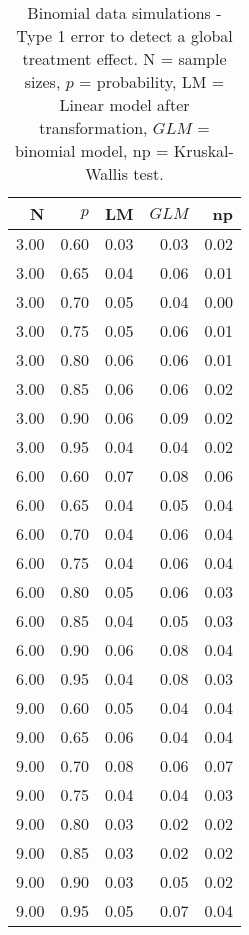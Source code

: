 \begin{table}[H]
\centering
\caption{Binomial data simulations - Type 1 error to detect a global treatment effect. N = sample sizes, 
             $p$ = probability, LM = Linear model after transformation, 
             $GLM$ = binomial model, np = Kruskal-Wallis test.} 
\label{tab:t1_glob_p}
{\footnotesize
\begin{tabular}{rrrrr}
  \hline
N & $p$ & LM & $GLM$ & np \\ 
  \hline
3.00 & 0.60 & 0.03 & 0.03 & 0.02 \\ 
  3.00 & 0.65 & 0.04 & 0.06 & 0.01 \\ 
  3.00 & 0.70 & 0.05 & 0.04 & 0.00 \\ 
  3.00 & 0.75 & 0.05 & 0.06 & 0.01 \\ 
  3.00 & 0.80 & 0.06 & 0.06 & 0.01 \\ 
  3.00 & 0.85 & 0.06 & 0.06 & 0.02 \\ 
  3.00 & 0.90 & 0.06 & 0.09 & 0.02 \\ 
  3.00 & 0.95 & 0.04 & 0.04 & 0.02 \\ 
  6.00 & 0.60 & 0.07 & 0.08 & 0.06 \\ 
  6.00 & 0.65 & 0.04 & 0.05 & 0.04 \\ 
  6.00 & 0.70 & 0.04 & 0.06 & 0.04 \\ 
  6.00 & 0.75 & 0.04 & 0.06 & 0.04 \\ 
  6.00 & 0.80 & 0.05 & 0.06 & 0.03 \\ 
  6.00 & 0.85 & 0.04 & 0.05 & 0.03 \\ 
  6.00 & 0.90 & 0.06 & 0.08 & 0.04 \\ 
  6.00 & 0.95 & 0.04 & 0.08 & 0.03 \\ 
  9.00 & 0.60 & 0.05 & 0.04 & 0.04 \\ 
  9.00 & 0.65 & 0.06 & 0.04 & 0.04 \\ 
  9.00 & 0.70 & 0.08 & 0.06 & 0.07 \\ 
  9.00 & 0.75 & 0.04 & 0.04 & 0.03 \\ 
  9.00 & 0.80 & 0.03 & 0.02 & 0.02 \\ 
  9.00 & 0.85 & 0.03 & 0.02 & 0.02 \\ 
  9.00 & 0.90 & 0.03 & 0.05 & 0.02 \\ 
  9.00 & 0.95 & 0.05 & 0.07 & 0.04 \\ 
   \hline
\end{tabular}
}
\end{table}
